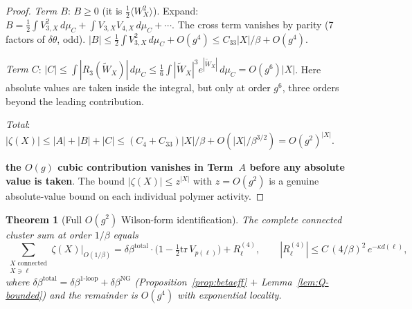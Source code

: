 \documentclass[11pt]{article}
\newtheorem{theorem}{Theorem}[section]
\theoremstyle{definition}
\newcommand{\tr}{\mathrm{tr}}
\begin{document}
\begin{proof}
\emph{Term $B$}: $B\ge 0$ (it is $\frac{1}{2}\langle W_X^2\rangle$).
Expand: $B=\frac{1}{2}\int V_{3,X}^2\,d\mu_C
+\int V_{3,X}V_{4,X}\,d\mu_C+\cdots$.
The cross term vanishes by parity (7 factors of $\delta\theta$, odd).
$|B|\le\frac{1}{2}\int V_{3,X}^2\,d\mu_C+O(g^4)
\le C_{33}|X|/\beta+O(g^4)$.

\emph{Term $C$}: $|C|\le\int|R_3(\widetilde{W}_X)|\,d\mu_C
\le\frac{1}{6}\int|\widetilde{W}_X|^3 e^{|\widetilde{W}_X|}\,d\mu_C
=O(g^6)|X|$.
Here absolute values are taken inside the integral, but only
at order $g^6$, three orders beyond the leading contribution.

\emph{Total}: $|\zeta(X)|\le|A|+|B|+|C|
\le(C_4+C_{33})|X|/\beta+O(|X|/\beta^{3/2})
=O(g^2)^{|X|}$.

\textbf{the $O(g)$ cubic contribution vanishes
in Term~$A$ before any absolute value is taken}.  The bound
$|\zeta(X)|\le z^{|X|}$ with $z=O(g^2)$ is a genuine
absolute-value bound on each individual polymer activity.
\end{proof}

\begin{theorem}[Full $O(g^2)$ Wilson-form identification]%
\label{thm:wilson-id}
The complete connected cluster sum at order $1/\beta$ equals
\begin{equation}\label{eq:full-wilson-id}
\sum_{\substack{X\text{ connected}\\X\ni\ell}}
\zeta(X)\Big|_{O(1/\beta)}
=\delta\beta^{\mathrm{total}}\cdot
\bigl(1-\tfrac{1}{2}\tr\,V_{p(\ell)}\bigr)
+R_\ell^{(4)},
\qquad |R_\ell^{(4)}|\le C\,(4/\beta)^2\,e^{-\kappa d(\ell)},
\end{equation}
where $\delta\beta^{\mathrm{total}}
=\delta\beta^{1\text{-loop}}+\delta\beta^{\mathrm{NG}}$
(Proposition~\ref{prop:betaeff} $+$ Lemma~\ref{lem:Q-bounded})
and the remainder is $O(g^4)$ with exponential locality.
\end{theorem}
\end{document}

